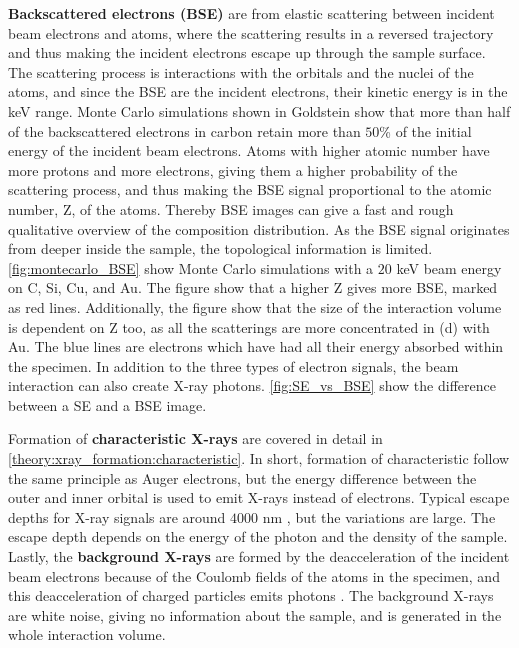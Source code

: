 \textbf{Backscattered electrons (BSE)} are from elastic scattering between incident beam electrons and atoms, where the scattering results in a reversed trajectory and thus making the incident electrons escape up through the sample surface.
The scattering process is interactions with the orbitals and the nuclei of the atoms, and since the BSE are the incident electrons, their kinetic energy is in the keV range.
Monte Carlo simulations shown in Goldstein \cite[Fig. 2.16 b]{goldstein_scanning_2018} show that more than half of the backscattered electrons in carbon retain more than $50$\% of the initial energy of the incident beam electrons.
Atoms with higher atomic number have more protons and more electrons, giving them a higher probability of the scattering process, and thus making the BSE signal proportional to the atomic number, Z, of the atoms.
Thereby BSE images can give a fast and rough qualitative overview of the composition distribution.
As the BSE signal originates from deeper inside the sample, the topological information is limited.
\cref{fig:montecarlo_BSE} show Monte Carlo simulations with a $20$ keV beam energy on C, Si, Cu, and Au.
The figure show that a higher Z gives more BSE, marked as red lines.
Additionally, the figure show that the size of the interaction volume is dependent on Z too, as all the scatterings are more concentrated in (d) with Au.
The blue lines are electrons which have had all their energy absorbed within the specimen.
In addition to the three types of electron signals, the beam interaction can also create X-ray photons.
\cref{fig:SE_vs_BSE} show the difference between a SE and a BSE image.


Formation of \textbf{characteristic X-rays} are covered in detail in \cref{theory:xray_formation:characteristic}.
In short, formation of characteristic follow the same principle as Auger electrons, but the energy difference between the outer and inner orbital is used to emit X-rays instead of electrons.
Typical escape depths for X-ray signals are around $4000$ nm \cite{hollas_modern_2004}, but the variations are large.
The escape depth depends on the energy of the photon and the density of the sample.
Lastly, the \textbf{background X-rays} are formed by the deacceleration of the incident beam electrons because of the Coulomb fields of the atoms in the specimen, and this deacceleration of charged particles emits photons \cite{notaros_electromagnetics_2010}.
The background X-rays are white noise, giving no information about the sample, and is generated in the whole interaction volume.



